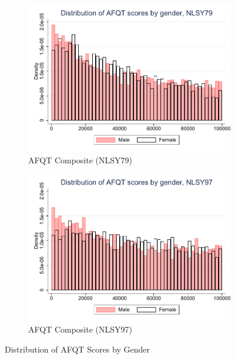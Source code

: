 \documentclass[onehalfspacing,11pt]{article}
\begin{document}
\begin{figure}
	\begin{subfigure}{0.49\textwidth}
		\includegraphics[width=\linewidth]{NLSY79_afqt79_gender.pdf}
		\caption{AFQT Composite (NLSY79)} \label{fig:nlsy79math}
	\end{subfigure}
	\hspace*{\fill} %
	\begin{subfigure}{0.49\textwidth}
		\includegraphics[width=\linewidth]{NLSY97_afqt97_gender.pdf}
		\caption{AFQT Composite (NLSY97)} \label{fig:nlsy79word}
	\end{subfigure}
	\caption{Distribution of AFQT Scores by Gender}
	\label{fig:nlsy_comp_by_gender}
\end{figure}
	
\end{document}
